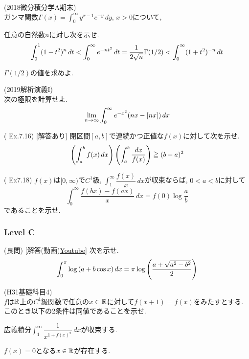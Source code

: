 \begin{prob} (2018微分積分学A期末)\\
ガンマ関数$\Gamma(x) = \int_{0}^{\infty} y^{x-1}e^{-y}\, dy$, $x>0$について,
\ben
\item 任意の自然数$n$に対し次を示せ.
\[\displaystyle\int_{0}^{1} (1-t^2)^{n} \, dt < \displaystyle\int_{0}^{\infty} e^{-nt^2}\, dt = \dfrac{1}{2\sqrt{n}}\Gamma(1/2) < \displaystyle\int_{0}^{\infty}(1+t^2)^{-n}\, dt\]
\item $\Gamma(1/2)$の値を求めよ.
\een
\end{prob}

\begin{prob} (2019解析演義I)\\
次の極限を計算せよ.
\[\displaystyle\lim_{n\to \infty} \displaystyle\int_{0}^{\infty} e^{-x^2} (nx - [nx])\, dx\]
\end{prob}

\begin{prob} (\cite{rikou} Ex.7.16) [解答あり]
閉区間$[a,b]$で連続かつ正値な$f(x)$に対して次を示せ.
\[\left( \int_{a}^{b}f(x)\, dx  \right)\left( \int_{a}^{b} \dfrac{dx}{f(x)} \right) \geqq (b-a)^2\]
\end{prob}

\begin{prob} (\cite{rikou} Ex7.18)
$f(x)$は$[0,\infty)$で$C^{1}$級, $\int_{1}^{\infty} \dfrac{f(x)}{x}\, dx$が収束ならば, $0<a<b$に対して
\[\int_{0}^{\infty} \dfrac{f(bx) - f(ax)}{x}\, dx = f(0)\log{\dfrac{a}{b}}\]
であることを示せ.
\end{prob}


\begin{prob}

\end{prob}



\subsubsection{Level C}
\begin{prob} (良問) [解答(動画)\href{https://www.youtube.com/watch?v=rpPJQ_70QZw}{Youtube}]
次を示せ.
\[
\int_{0}^{\pi} \log{(a+b\cos{x})}\, dx = \pi\log{\left( \dfrac{a+\sqrt{a^2-b^2}}{2} \right)}
\]
\end{prob}

\begin{prob} (H31基礎科目4) \label{prob:H31kiso4}\\
$f$は$\mathbb{R}$上の$C^1$級関数で任意の$x\in \mathbb{R}$に対して$f(x+1) = f(x)$をみたすとする. このとき以下の2条件は同値であることを示せ.
\ben
\item[(A)] 広義積分$\int_{1}^{\infty}\dfrac{1}{x^{1+f(x)^2}}\, dx$が収束する.
\item[(B)] $f(x) = 0$となる$x\in \mathbb{R}$が存在する.
\een
\end{prob}

